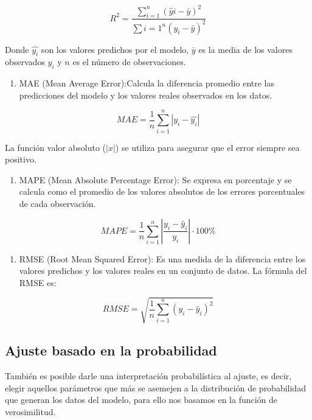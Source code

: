 \documentclass[
]{book}
\providecommand{\tightlist}{%
  \setlength{\itemsep}{0pt}\setlength{\parskip}{0pt}}
\begin{document}
\[ R^2 = \frac{\sum_{i=1}^n (\hat{y}i - \bar{y})^2}{\sum{i=1}^n (y_i - \bar{y})^2} \]

Donde \(\hat{y_i}\) son los valores predichos por el modelo, \(\bar{y}\) es
la media de los valores observados \(y_i\) y \(n\) es el número de
observaciones.

\begin{enumerate}
\def\labelenumi{\arabic{enumi}.}
\setcounter{enumi}{1}
\tightlist
\item
  MAE (Mean Average Error):Calcula la diferencia promedio entre las
  predicciones del modelo y los valores reales observados en los
  datos.
\end{enumerate}

\[MAE = \frac{1}{n}\sum_{i=1}^{n}|y_i - \hat{y_i}|\]

La función valor absoluto (\(|x|\)) se utiliza para asegurar que el error
siempre sea positivo.

\begin{enumerate}
\def\labelenumi{\arabic{enumi}.}
\setcounter{enumi}{2}
\tightlist
\item
  MAPE (Mean Absolute Percentage Error): Se expresa en porcentaje y se
  calcula como el promedio de los valores absolutos de los errores
  porcentuales de cada observación.
\end{enumerate}

\[MAPE = \frac{1}{n} \sum_{i=1}^{n} \left|\frac{y_i - \hat{y}_i}{y_i}\right|\cdot 100\%\]

\begin{enumerate}
\def\labelenumi{\arabic{enumi}.}
\setcounter{enumi}{3}
\tightlist
\item
  RMSE (Root Mean Squared Error): Es una medida de la diferencia entre
  los valores predichos y los valores reales en un conjunto de datos.
  La fórmula del RMSE es:
\end{enumerate}

\[ RMSE = \sqrt{\frac{1}{n}\sum_{i=1}^n(y_i - \hat{y}_i)^2} \]

\subsection{Ajuste basado en la probabilidad}\label{ajuste-basado-en-la-probabilidad-1}

También es posible darle una interpretación probabilística al ajuste, es
decir, elegir aquellos parámetros que más se asemejen a la distribución
de probabilidad que generan los datos del modelo, para ello nos basamos
en la función de verosimilitud.
\end{document}
